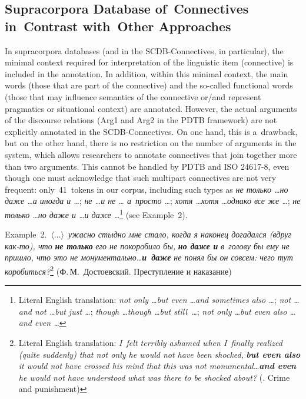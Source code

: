 \begin{multicols}{2}
\vspace*{-7pt}
  
  \section{Supracorpora Database of~Connectives in~Contrast with~Other Approaches}
  
  \vspace*{-2pt}
  
  \noindent
  In supracorpora databases (and in the SCDB-Connectives, in particular), the 
minimal context required for interpretation of the linguistic item (connective) is 
included in the annotation. In addition, within this minimal context, the main words 
(those that are part of the connective) and the so-called functional words (those that 
may influence semantics of the connective or/and represent pragmatics or situational 
context) are annotated. However, the actual arguments of the discourse relations 
(Arg1 and Arg2 in the PDTB framework) are not explicitly annotated in the  
SCDB-Connectives. On one hand, this is a~drawback, but on the other hand, there is 
no restriction on the number of arguments in the system, which allows researchers to 
annotate connectives that join together more than two arguments. This cannot be handled by PDTB and ISO  
24617-8, even though one must acknowledge that such multipart connectives are not 
very frequent: only~41~tokens in our corpus, including such types as \textit{не 
только \ldots но даже \ldots а иногда и \ldots}; \textit{не \ldots и не \ldots 
а~просто \ldots}; \textit{хотя \ldots хотя \ldots однако все же \ldots}; \textit{не 
только \ldots но даже и \ldots и даже \ldots}\footnote{Literal English translation: 
\textit{not only \ldots but even \ldots and sometimes also \ldots}; \textit{not \ldots and not \ldots but just 
\ldots}; \textit{though \ldots though \ldots but \mbox{still \ldots}}; \textit{not only \ldots but even also \ldots and 
even \ldots}} (see Example~2).
  
 
  Example~2.~$\langle\ldots\rangle$~\textit{ужасно стыдно мне стало, когда я наконец 
догадался (вдруг как-то), что} {\bfseries\textit{не только}} \textit{его не 
покоробило бы,} {\bfseries\textit{но даже и}} \textit{в~голову бы ему не пришло, 
что это не монументально}\ldots {\bfseries\textit{и~даже}} \textit{не понял бы он 
совсем: чего тут коробиться?}\footnote[2]{Literal English translation: \textit{I~felt terribly 
ashamed when I~finally realized (quite suddenly) that not only he would not have been shocked}, 
{\bfseries\textit{but even also}} \textit{it would not have crossed his mind that this was not 
monumental}\ldots {\bfseries\textit{and even}} \textit{he would not have understood what was there to be 
shocked about?} (. {Crime and punishment})} 
({Ф.\,М.~Достоевский}. Преступление и наказание)
  

\end{multicols}
